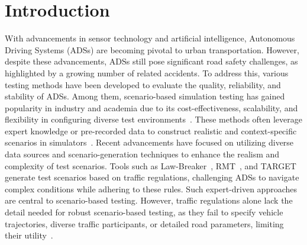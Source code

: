 \section{Introduction}
With advancements in sensor technology and artificial intelligence, Autonomous Driving Systems (ADSs) are becoming pivotal to urban transportation. However, despite these advancements, ADSs still pose significant road safety challenges, as highlighted by a growing number of related accidents. To address this, various testing methods have been developed to evaluate the quality, reliability, and stability of ADSs. Among them, scenario-based simulation testing has gained popularity in industry and academia due to its cost-effectiveness, scalability, and flexibility in configuring diverse test environments~\cite{10.1145/3540250.3549111}. These methods often leverage expert knowledge or pre-recorded data to construct realistic and context-specific scenarios in simulators~\cite{nalic2020scenario}. Recent advancements have focused on utilizing diverse data sources and scenario-generation techniques to enhance the realism and complexity of test scenarios. Tools such as Law-Breaker~\cite{sun2022lawbreaker}, RMT~\cite{deng2021rmt}, and TARGET~\cite{deng2023targetautomatedscenariogeneration} generate test scenarios based on traffic regulations, challenging ADSs to navigate complex conditions while adhering to these rules. Such expert-driven approaches are central to scenario-based testing. However, traffic regulations alone lack the detail needed for robust scenario-based testing, as they fail to specify vehicle trajectories, diverse traffic participants, or detailed road parameters, limiting their utility~\cite{TexasDMV2022}.
